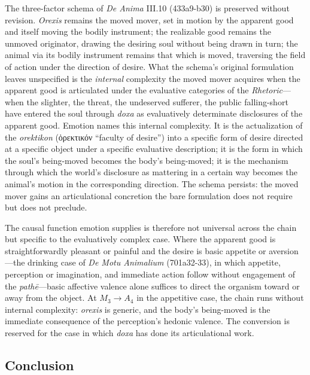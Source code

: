 \documentclass{article}
\newcommand{\gk}[1]{{\greekfont #1}}
\begin{document}
The three-factor schema of \textit{De Anima} III.10 (433a9-b30) is preserved without revision. \textit{Orexis} remains the moved mover, set in motion by the apparent good and itself moving the bodily instrument; the realizable good remains the unmoved originator, drawing the desiring soul without being drawn in turn; the animal via its bodily instrument remains that which is moved, traversing the field of action under the direction of desire. What the schema's original formulation leaves unspecified is the \textit{internal} complexity the moved mover acquires when the apparent good is articulated under the evaluative categories of the \textit{Rhetoric}---when the slighter, the threat, the undeserved sufferer, the public falling-short have entered the soul through \textit{doxa} as evaluatively determinate disclosures of the apparent good. Emotion names this internal complexity. It is the actualization of the \textit{orektikon} (\gk{ὀρεκτικόν} ``faculty of desire'') into a specific form of desire directed at a specific object under a specific evaluative description; it is the form in which the soul's being-moved becomes the body's being-moved; it is the mechanism through which the world's disclosure as mattering in a certain way becomes the animal's motion in the corresponding direction. The schema persists: the moved mover gains an articulational concretion the bare formulation does not require but does not preclude.

The causal function emotion supplies is therefore not universal across the chain but specific to the evaluatively complex case. Where the apparent good is straightforwardly pleasant or painful and the desire is basic appetite or aversion---the drinking case of \textit{De Motu Animalium} (701a32-33), in which appetite, perception or imagination, and immediate action follow without engagement of the \textit{pathē}---basic affective valence alone suffices to direct the organism toward or away from the object. At $M_3 \rightarrow A_4$ in the appetitive case, the chain runs without internal complexity: \textit{orexis} is generic, and the body's being-moved is the immediate consequence of the perception's hedonic valence. The conversion is reserved for the case in which \textit{doxa} has done its articulational work. 

\subsection{Conclusion}
\end{document}
